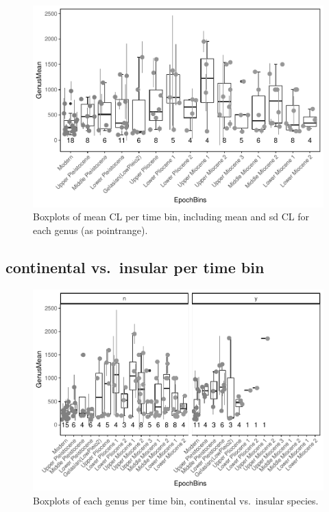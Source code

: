 \documentclass[]{article}
\begin{document}
\begin{figure}[htbp]
\centering
\includegraphics{MA_JJ_files/figure-latex/Boxplots of each genus per time bin-1.pdf}
\caption{Boxplots of mean CL per time bin, including mean and sd CL for
each genus (as pointrange).}
\end{figure}

\newpage

\subsection{continental vs.~insular per time
bin}\label{continental-vs.insular-per-time-bin}

\begin{figure}[htbp]
\centering
\includegraphics{MA_JJ_files/figure-latex/Boxplots of each genus per time bin, continental vs. insular-1.pdf}
\caption{Boxplots of each genus per time bin, continental vs.~insular
species.}
\end{figure}
\end{document}
